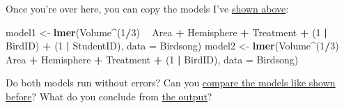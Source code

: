 \documentclass[
]{book}
\newenvironment{Shaded}{\begin{snugshade}}{\end{snugshade}}
\newcommand{\DataTypeTok}[1]{\textcolor[rgb]{0.13,0.29,0.53}{#1}}
\newcommand{\DecValTok}[1]{\textcolor[rgb]{0.00,0.00,0.81}{#1}}
\newcommand{\KeywordTok}[1]{\textcolor[rgb]{0.13,0.29,0.53}{\textbf{#1}}}
\newcommand{\NormalTok}[1]{#1}
\newcommand{\OperatorTok}[1]{\textcolor[rgb]{0.81,0.36,0.00}{\textbf{#1}}}
\newcommand{\StringTok}[1]{\textcolor[rgb]{0.31,0.60,0.02}{#1}}
\begin{document}
Once you're over here, you can copy the models I've \protect\hyperlink{brainmodel}{shown above}:

\begin{Shaded}
\begin{Highlighting}[]
\NormalTok{model1 <-}\StringTok{ }\KeywordTok{lmer}\NormalTok{(Volume}\OperatorTok{^}\NormalTok{(}\DecValTok{1}\OperatorTok{/}\DecValTok{3}\NormalTok{) }\OperatorTok{~}\StringTok{ }\NormalTok{Area }\OperatorTok{+}\StringTok{ }\NormalTok{Hemisphere }\OperatorTok{+}\StringTok{ }\NormalTok{Treatment }\OperatorTok{+}\StringTok{ }\NormalTok{(}\DecValTok{1} \OperatorTok{|}\StringTok{ }\NormalTok{BirdID) }\OperatorTok{+}\StringTok{ }\NormalTok{(}\DecValTok{1} \OperatorTok{|}\StringTok{ }\NormalTok{StudentID), }
               \DataTypeTok{data =}\NormalTok{ Birdsong)}
\NormalTok{model2 <-}\StringTok{ }\KeywordTok{lmer}\NormalTok{(Volume}\OperatorTok{^}\NormalTok{(}\DecValTok{1}\OperatorTok{/}\DecValTok{3}\NormalTok{) }\OperatorTok{~}\StringTok{ }\NormalTok{Area }\OperatorTok{+}\StringTok{ }\NormalTok{Hemisphere }\OperatorTok{+}\StringTok{ }\NormalTok{Treatment }\OperatorTok{+}\StringTok{ }\NormalTok{(}\DecValTok{1} \OperatorTok{|}\StringTok{ }\NormalTok{BirdID), }
               \DataTypeTok{data =}\NormalTok{ Birdsong)}
\end{Highlighting}
\end{Shaded}

Do both models run without errors? Can you \protect\hyperlink{comparebrain}{compare the models like shown before}? What do you conclude from \protect\hyperlink{brainoutput}{the output}?
\end{document}
